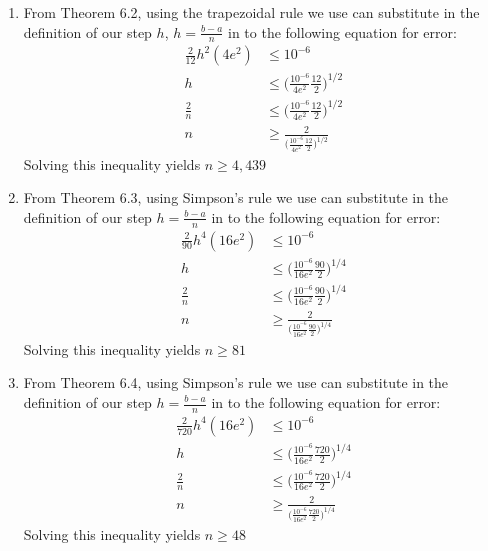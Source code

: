 \documentclass[11pt,a4paper]{article}
\begin{document}
\begin{itemize}
\begin{enumerate} [label={\alph*)}]
					\item From Theorem 6.2, using the trapezoidal rule we use can substitute in the definition of our step $h$, $h=\frac{b-a}{n}$ in to the following equation for error:
					\begin{align*}
						\frac{2}{12}h^2 (4e^2) &\leq 10^{-6} \\
						h &\leq \Big( \frac{10^{-6}}{4e^2} \frac{12}{2} \Big)^{1/2} \\
						\frac{2}{n} &\leq \Big( \frac{10^{-6}}{4e^2} \frac{12}{2} \Big)^{1/2} \\
						n &\geq \frac{2}{\Big( \frac{10^{-6}}{4e^2} \frac{12}{2} \Big)^{1/2}}
					\end{align*}
					Solving this inequality yields $n \geq	4,439$
					
					\item From Theorem 6.3, using Simpson's rule we use can substitute in the definition of our step $h=\frac{b-a}{n}$ in to the following equation for error:
					\begin{align*}
					\frac{2}{90}h^4(16e^2) &\leq 10^{-6} \\
					h &\leq \Big( \frac{10^{-6}}{16e^2} \frac{90}{2} \Big)^{1/4} \\
					\frac{2}{n} &\leq \Big( \frac{10^{-6}}{16e^2} \frac{90}{2} \Big)^{1/4} \\
					n &\geq \frac{2}{\Big( \frac{10^{-6}}{16e^2} \frac{90}{2} \Big)^{1/4}}
					\end{align*}
					Solving this inequality yields $n \geq 81$
					
					\item From Theorem 6.4, using Simpson's rule we use can substitute in the definition of our step $h=\frac{b-a}{n}$ in to the following equation for error:
					\begin{align*}
					\frac{2}{720}h^4(16e^2) &\leq 10^{-6} \\
					h &\leq \Big( \frac{10^{-6}}{16e^2} \frac{720}{2} \Big)^{1/4} \\
					\frac{2}{n} &\leq \Big( \frac{10^{-6}}{16e^2} \frac{720}{2} \Big)^{1/4} \\
					n &\geq \frac{2}{\Big( \frac{10^{-6}}{16e^2} \frac{720}{2} \Big)^{1/4}}
					\end{align*}
					Solving this inequality yields $n \geq 48$
				\end{enumerate}
					

\end{itemize}
\end{document}
